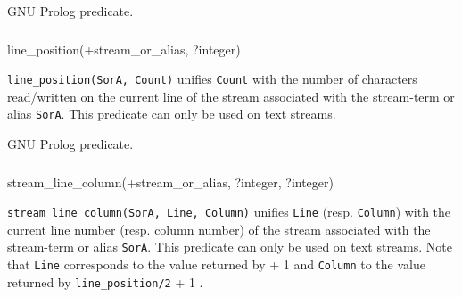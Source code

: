 GNU Prolog predicate.

\subsubsection{\label{line-position/2}}

\begin{TemplatesOneCol}
line\_position(+stream\_or\_alias, ?integer)

\end{TemplatesOneCol}

\Description

\texttt{line\_position(SorA, Count)} unifies
\texttt{Count} with the number of characters read/written on the current
line of the stream associated with the stream-term or alias
\texttt{SorA}. This predicate can only be used on text streams.

\begin{PlErrors}






\end{PlErrors}

\Portability

GNU Prolog predicate.

\subsubsection{}

\begin{TemplatesOneCol}
stream\_line\_column(+stream\_or\_alias, ?integer, ?integer)

\end{TemplatesOneCol}

\Description

\texttt{stream\_line\_column(SorA, Line, Column)} unifies \texttt{Line}
(resp. \texttt{Column}) with the current line number (resp. column number)
of the stream associated with the stream-term or alias \texttt{SorA}. This
predicate can only be used on text streams. Note that \texttt{Line}
corresponds to the value returned by  + 1
 and \texttt{Column} to the value returned
by \texttt{line\_position/2} + 1 .


